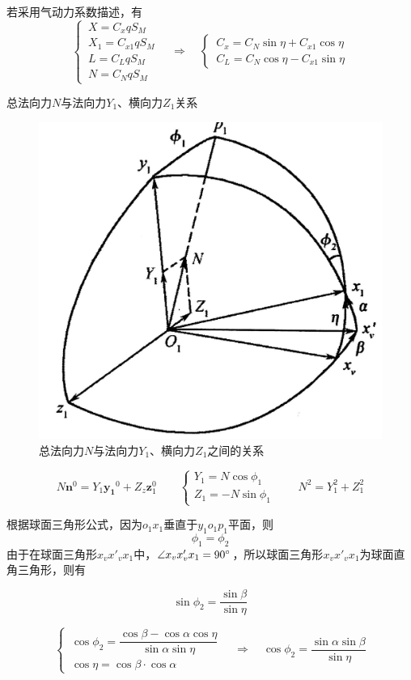 若采用气动力系数描述，有
\begin{equation}
	\begin{cases}
		\, X = C_xqS_M \\
		\, X_1 = C_{x1} q S_M \\
		\, L = C_L q S_M \\
		\, N = C_N q S_M
	\end{cases}
	\quad \Longrightarrow \quad 
	\begin{cases}
		\, C_x = C_N \sin \eta + C_{x1} \cos \eta \\
		\, C_L = C_N \cos \eta - C_{x1} \sin \eta
	\end{cases}
\end{equation}
\vspace*{0.5em}

\noa[3] 总法向力$N$与法向力$Y_1$、横向力$Z_1$关系
\begin{figure}[!htb]
	\centering
	\includegraphics[width=0.4\linewidth]{pic/总法向力.jpg}
	\caption{总法向力$N$与法向力$Y_1$、横向力$Z_1$之间的关系}
\end{figure}
\vspace*{-1em}
\begin{equation}
	N \bm{n}^0 = Y_1\bm{y_1}^0 + Z_z \bm{z}_1^0 \qquad 
	\begin{cases}
		Y_1 = N \cos \phi_1 \\
		Z_1 = - N \sin \phi_1 
	\end{cases}
	\qquad 
	N^2 = Y_1^2 + Z_1^2
\end{equation}
\par 根据球面三角形公式，因为$o_1x_1$垂直于$y_1o_1p_1$平面，则
\begin{equation}
	\phi_1 = \phi_2
\end{equation}
由于在球面三角形$x_vx'_vx_1$中，$\angle x_vx'_v x_1 = 90 {}^{\circ}$，所以球面三角形$x_vx'_vx_1$为球面直角三角形，则有
\par \blue[正弦公式]
\begin{equation}
	\sin \phi_2 = \dfrac{\sin \beta}{\sin \eta}
\end{equation}
\par \blue[余弦公式]
\begin{equation}
	\begin{cases}
		\, \cos \phi_2 = \dfrac{\cos \beta - \cos \alpha \cos \eta }{\sin \alpha \sin \eta}\\[0.5em]
		\, \cos \eta = \cos \beta \cdot \cos \alpha
	\end{cases}
	\quad \Rightarrow \quad 
	\cos \phi_2 = \dfrac{\sin \alpha \sin \beta}{\sin \eta}
\end{equation}

